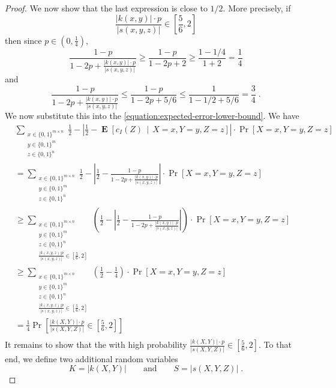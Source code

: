 \documentclass[10pt]{article}
\DeclareMathOperator{\Exp}{\mathbf{E}}
\begin{document}
\begin{proof}
We now show that the last expression is close to $1/2$. More precisely, if
\begin{equation}
\frac{|k(x,y)| \cdot p}{|s(x,y,z)|} \in \left[\frac{5}{6}, 2 \right]
\end{equation}
then since $p \in (0,\frac{1}{4})$,
$$
\frac{\displaystyle 1 - p}{\displaystyle 1 - 2p + \frac{|k(x,y)| \cdot p}{|s(x,y,z)|}} \ge
\frac{\displaystyle 1 - p}{\displaystyle 1 - 2p + 2} \ge \frac{\displaystyle 1 - 1/4}{\displaystyle 1 + 2} = \frac{1}{4}
$$
and
$$
\frac{\displaystyle 1 - p}{\displaystyle 1 - 2p + \frac{|k(x,y)| \cdot p}{|s(x,y,z)|}} \le
\frac{\displaystyle 1 - p}{\displaystyle 1 - 2p + 5/6} \le \frac{\displaystyle 1}{\displaystyle 1 - 1/2 + 5/6} = \frac{3}{4} \; .
$$
We now substitute this into the \eqref{equation:expected-error-lower-bound}. We have
\begin{align*}
& \sum_{\substack{x \in \{0,1\}^{m \times n} \\ y \in \{0,1\}^m \\ z \in \{0,1\}^n}} \frac{1}{2} - \left| \frac{1}{2} - \Exp\left[ c_I(Z) \, \middle| \, X = x, Y = y, Z = z \right] \right| \cdot \Pr \left[X = x, Y = y, Z = z \right] \\
& = \sum_{\substack{x \in \{0,1\}^{m \times n} \\ y \in \{0,1\}^m \\ z \in \{0,1\}^n}} \frac{1}{2} - \left| \frac{1}{2} - \frac{\displaystyle 1 - p}{\displaystyle 1 - 2p + \frac{|k(x,y)| \cdot p}{|s(x,y,z)|}} \right| \cdot \Pr \left[X = x, Y = y, Z = z \right] \\
& \ge
\sum_{\substack{x \in \{0,1\}^{m \times n} \\ y \in \{0,1\}^m \\ z \in \{0,1\}^n \\ \frac{|k(x,y,z)| p}{|s(x,y,z)|} \in [\frac{5}{6},2]}} \left( \frac{1}{2} - \left| \frac{1}{2} - \frac{\displaystyle 1 - p}{\displaystyle 1 - 2p + \frac{|k(x,y)| \cdot p}{|s(x,y,z)|}} \right|  \right) \cdot \Pr \left[X = x, Y = y, Z = z \right] \\
& \ge
\sum_{\substack{x \in \{0,1\}^{m \times n} \\ y \in \{0,1\}^m \\ z \in \{0,1\}^n \\ \frac{|k(x,y,z)| p}{|s(x,y,z)|} \in [\frac{5}{6},2]}} \left( \frac{1}{2} - \frac{1}{4} \right) \cdot \Pr \left[X = x, Y = y, Z = z \right] \\
& =
\frac{1}{4} \Pr \left[ \frac{|k(X,Y)| \cdot p}{|s(X,Y,Z)|} \in \left[\frac{5}{6}, 2 \right]  \right] \\
\end{align*}
It remains to show that the with high probability $\frac{|k(X,Y)| \cdot p}{|s(X,Y,Z)|} \in \left[\frac{5}{6}, 2 \right]$.
To that end, we define two additional random variables
$$
K = |k(X,Y)| \qquad \text{and} \qquad S = |s(X,Y,Z)| \; .
$$


\end{proof}
\end{document}
